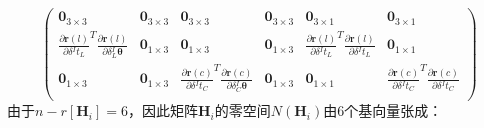 \begin{equation}
\begin{pmatrix}
    \boldsymbol{0}_{3\times 3}                                                             &
    \boldsymbol{0}_{3\times 3}                                                             &
    \boldsymbol{0}_{3\times 3}                                                             &
    \boldsymbol{0}_{3\times 3}                                                             &
    \boldsymbol{0}_{3\times 1}                                                             &
    \boldsymbol{0}_{3\times 1}                                                               \\
    \frac{\partial \boldsymbol{r}(l)}{\partial \delta {^{I}t_{L}}}^T
    \frac{\partial \boldsymbol{r}(l)}{\partial \delta {^{I}_{L}\boldsymbol{\theta}}}  &
    \boldsymbol{0}_{1\times 3}                                                             &
    \boldsymbol{0}_{1\times 3}                                                             &
    \boldsymbol{0}_{1\times 3}                                                             &
    \frac{\partial \boldsymbol{r}(l)}{\partial \delta {^{I}t_{L}}}^T
    \frac{\partial \boldsymbol{r}(l)}{\partial \delta {^{I}t_{L}}}                    &
    \boldsymbol{0}_{1\times 1}                                                               \\
    \boldsymbol{0}_{1\times 3}                                                             &
    \boldsymbol{0}_{1\times 3}                                                             &
    \frac{\partial \boldsymbol{r}(c)}{\partial \delta {^{I}t_{C}}}^T
    \frac{\partial \boldsymbol{r}(c)}{\partial \delta {^{I}_{C}\boldsymbol{\theta}}}  &
    \boldsymbol{0}_{1\times 3}                                                             &
    \boldsymbol{0}_{1\times 1}                                                             &
    \frac{\partial \boldsymbol{r}(c)}{\partial \delta {^{I}t_{C}}}^T
    \frac{\partial \boldsymbol{r}(c)}{\partial \delta {^{I}t_{C}}}                      \\
  \end{pmatrix}
\end{equation}
由于$n-r\left[ \boldsymbol{H}_i\right] =6$，因此矩阵$\boldsymbol{H}_i$的零空间$N(\boldsymbol{H}_i)$由6个基向量张成：
